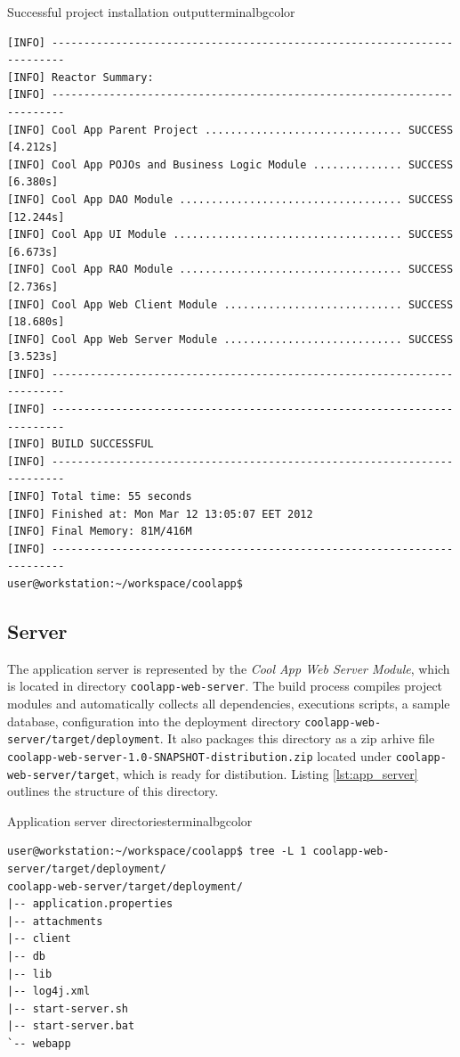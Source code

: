   \begin{code}{Successful project installation output}{\label{lst:mvn_clean_install_completed}}{terminalbgcolor}
      \begin{lstlisting}
[INFO] ------------------------------------------------------------------------
[INFO] Reactor Summary:
[INFO] ------------------------------------------------------------------------
[INFO] Cool App Parent Project ............................... SUCCESS [4.212s]
[INFO] Cool App POJOs and Business Logic Module .............. SUCCESS [6.380s]
[INFO] Cool App DAO Module ................................... SUCCESS [12.244s]
[INFO] Cool App UI Module .................................... SUCCESS [6.673s]
[INFO] Cool App RAO Module ................................... SUCCESS [2.736s]
[INFO] Cool App Web Client Module ............................ SUCCESS [18.680s]
[INFO] Cool App Web Server Module ............................ SUCCESS [3.523s]
[INFO] ------------------------------------------------------------------------
[INFO] ------------------------------------------------------------------------
[INFO] BUILD SUCCESSFUL
[INFO] ------------------------------------------------------------------------
[INFO] Total time: 55 seconds
[INFO] Finished at: Mon Mar 12 13:05:07 EET 2012
[INFO] Final Memory: 81M/416M
[INFO] ------------------------------------------------------------------------
user@workstation:~/workspace/coolapp$ 
      \end{lstlisting}
  \end{code}

\subsection{Server}

  The application server is represented by the \emph{Cool App Web Server Module}, which is located in directory \texttt{coolapp-web-server}.
  The build process compiles project modules and automatically collects all dependencies, executions scripts, a sample database, configuration into the deployment directory \texttt{coolapp-web-server/target/deployment}.
  It also packages this directory as a zip arhive file \texttt{coolapp-web-server-1.0-SNAPSHOT-distribution.zip} located under \texttt{coolapp-web-server/target}, which is ready for distibution.
  Listing \ref{lst:app_server} outlines the structure of this directory.

  \begin{code}{Application server directories}{\label{lst:app_server}}{terminalbgcolor}
     \begin{lstlisting}
user@workstation:~/workspace/coolapp$ tree -L 1 coolapp-web-server/target/deployment/
coolapp-web-server/target/deployment/
|-- application.properties
|-- attachments
|-- client
|-- db
|-- lib
|-- log4j.xml
|-- start-server.sh
|-- start-server.bat
`-- webapp
     \end{lstlisting}
  \end{code}

